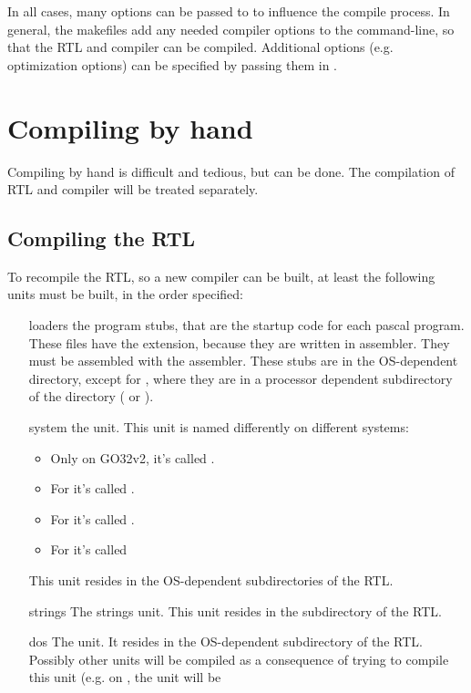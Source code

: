 {In all cases, many options can be passed to  to influence the
compile process. In general, the makefiles add any needed compiler options
to the command-line, so that the RTL and compiler can be compiled. 
Additional options (e.g. optimization options) can be specified by passing them in
.

\section{Compiling by hand}

Compiling by hand is difficult and tedious, but can be done. The 
compilation of RTL and compiler will be treated separately.

\subsection{Compiling the RTL}
To recompile the RTL, so a new compiler can be built, at least the following
units must be built, in the order specified:
\begin{enumerate}
\item[loaders] the program stubs, that are the startup code for each pascal
program. These files have the  extension, because they are written
in assembler. They must be assembled with the \gnu {} assembler. These stubs
are in the OS-dependent directory, except for \linux, where they are in a
processor dependent subdirectory of the \linux directory ( or
).
\item[system] the  unit. This unit is named differently on different
systems:
\begin{itemize}
\item Only on GO32v2, it's called .
\item For \linux it's called .
\item For \windowsnt it's called .
\item For \ostwo it's called 
\end{itemize}
This unit resides in the OS-dependent subdirectories of the RTL.
\item[strings] The strings unit. This unit resides in the 
subdirectory of the RTL.
\item[dos] The  unit. It resides in the OS-dependent subdirectory
of the RTL. Possibly other units will be compiled as a consequence of trying
to compile this unit (e.g. on \linux, the  unit will be

\end{enumerate}}
